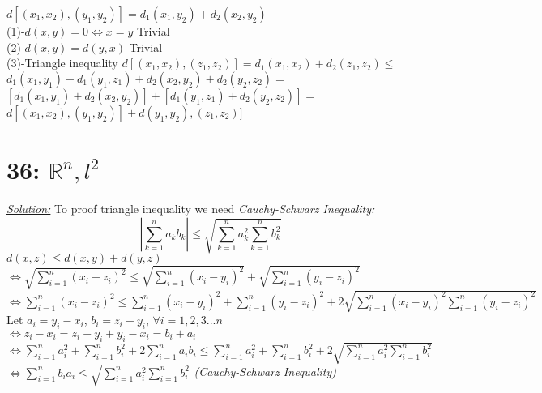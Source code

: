 \documentclass{amsbook}
\begin{document}
\begin{tcolorbox}[enhanced,attach boxed title to top center={yshift=-3mm,yshifttext=-1mm},
  colback=blue!5!white,colframe=blue!75!black,colbacktitle=red!80!black,
  title={Exercise 35.8:},fonttitle=\bfseries,
  boxed title style={size=small,colframe=red!50!black} ]
 $d[(x_1,x_2),(y_1,y_2)]=d_1(x_1,y_2)+d_2(x_2,y_2)$\\
  (1)-$d(x,y)=0\iff x=y$ Trivial\\
  (2)-$d(x,y)=d(y,x)$ Trivial\\
  (3)-Triangle inequality $d[(x_1,x_2),(z_1,z_2)]=d_1(x_1,x_2)+d_2(z_1,z_2)\leq$\\ 
  $d_1(x_1,y_1)+d_1(y_1,z_1)+d_2(x_2,y_2)+d_2(y_2,z_2)=$\\
  $[d_1(x_1,y_1)+d_2(x_2,y_2)]+[d_1(y_1,z_1)+d_2(y_2,z_2)]=$\\ 
  $d[(x_1,x_2),(y_1,y_2)]+d(y_1,y_2),(z_1,z_2)]$
\end{tcolorbox}
\section{36: $\mathbb{R}^n, l^2$}

\begin{tcolorbox}[enhanced,attach boxed title to top center={yshift=-3mm,yshifttext=-1mm},
  colback=blue!5!white,colframe=blue!75!black,colbacktitle=red!80!black,
  title= {$(\mathbb{R}^n,d)$ is a metric space, $d=\sqrt{\sum_{i=1}^{n}(x_i-y_i)^2}:$:},fonttitle=\bfseries,
  boxed title style={size=small,colframe=red!50!black} ]
     \textit{\color{blue}\underline{Solution:}}
     To proof triangle inequality we need \textit{\color{blue}Cauchy-Schwarz	Inequality:}\\
{$$\left |\sum_{k=1}^{n}a_k b_k \right |\leq \sqrt{\sum_{k=1}^{n}a_k^2 \sum_{k=1}^{n}b_k^2}$$}
$d(x,z)\leq d(x,y)+d(y,z)$\\
$\Leftrightarrow \sqrt{\sum_{i=1}^{n}(x_i-z_i)^2}\leq 
\sqrt{\sum_{i=1}^{n}(x_i-y_i)^2}+\sqrt{\sum_{i=1}^{n}(y_i-z_i)^2}$\\
$\Leftrightarrow \sum_{i=1}^{n}(x_i-z_i)^2\leq 
\sum_{i=1}^{n}(x_i-y_i)^2+\sum_{i=1}^{n}(y_i-z_i)^2+2\sqrt{\sum_{i=1}^{n}(x_i-y_i)^2\sum_{i=1}^{n}(y_i-z_i)^2}$\\
Let $a_i=y_i-x_i$,  $b_i=z_i-y_i$, $\forall i=1,2,3...n$\\
$\Leftrightarrow z_i-x_i=z_i-y_i+y_i-x_i=b_i+a_i$\\
$\Leftrightarrow \sum_{i=1}^{n}a_i^2+ \sum_{i=1}^{n}b_i^2+2\sum_{i=1}^{n}a_i b_i\leq 
\sum_{i=1}^{n}a_i^2+\sum_{i=1}^{n}b_i^2+2\sqrt{\sum_{i=1}^{n}a_i^2\sum_{i=1}^{n} b_i^2}$
$\Leftrightarrow \sum_{i=1}^{n}b_i a_i\leq \sqrt{\sum_{i=1}^{n}a_i^2\sum_{i=1}^{n} b_i^2}$ 
\textit{\color{blue}(Cauchy-Schwarz Inequality)}
\end{tcolorbox}
\end{document}
